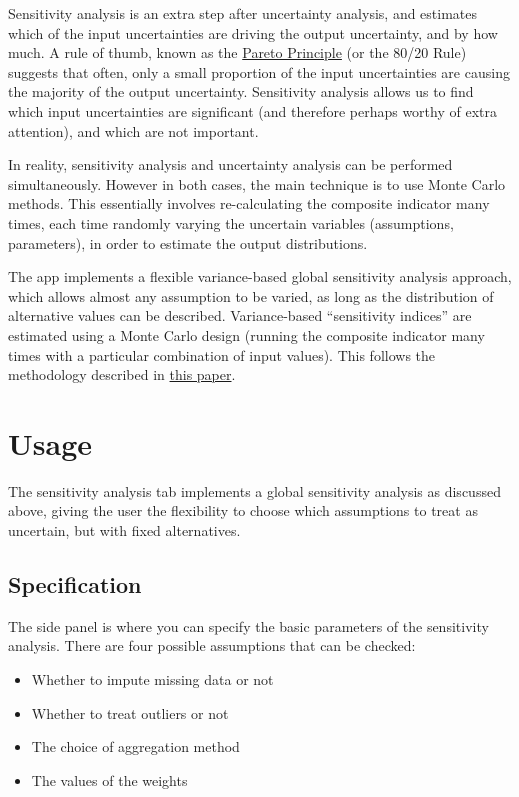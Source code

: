 \documentclass[
  letterpaper,
  DIV=11,
  numbers=noendperiod]{scrreprt}
\providecommand{\tightlist}{%
  \setlength{\itemsep}{0pt}\setlength{\parskip}{0pt}}\usepackage{longtable,booktabs,array}
\begin{document}
Sensitivity analysis is an extra step after uncertainty analysis, and
estimates which of the input uncertainties are driving the output
uncertainty, and by how much. A rule of thumb, known as the
\href{https://en.wikipedia.org/wiki/Pareto_principle}{Pareto Principle}
(or the 80/20 Rule) suggests that often, only a small proportion of the
input uncertainties are causing the majority of the output uncertainty.
Sensitivity analysis allows us to find which input uncertainties are
significant (and therefore perhaps worthy of extra attention), and which
are not important.

In reality, sensitivity analysis and uncertainty analysis can be
performed simultaneously. However in both cases, the main technique is
to use Monte Carlo methods. This essentially involves re-calculating the
composite indicator many times, each time randomly varying the uncertain
variables (assumptions, parameters), in order to estimate the output
distributions.

The app implements a flexible variance-based global sensitivity analysis
approach, which allows almost any assumption to be varied, as long as
the distribution of alternative values can be described. Variance-based
``sensitivity indices'' are estimated using a Monte Carlo design
(running the composite indicator many times with a particular
combination of input values). This follows the methodology described in
\href{https://doi.org/10.1111/j.1467-985X.2005.00350.x}{this paper}.

\hypertarget{usage}{%
\section{Usage}\label{usage}}

The sensitivity analysis tab implements a global sensitivity analysis as
discussed above, giving the user the flexibility to choose which
assumptions to treat as uncertain, but with fixed alternatives.

\hypertarget{specification}{%
\subsection{Specification}\label{specification}}

The side panel is where you can specify the basic parameters of the
sensitivity analysis. There are four possible assumptions that can be
checked:

\begin{itemize}
\tightlist
\item
  Whether to impute missing data or not
\item
  Whether to treat outliers or not
\item
  The choice of aggregation method
\item
  The values of the weights
\end{itemize}
\end{document}

